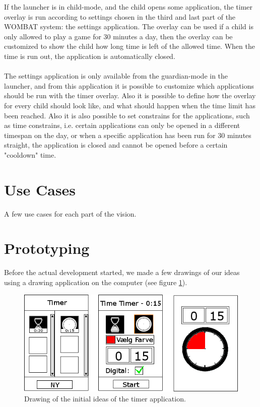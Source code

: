 	If the launcher is in child-mode, and the child opens some application, the timer overlay is run according to settings chosen in the third and last part of the WOMBAT system: the settings application. The overlay can be used if a child is only allowed to play a game for 30 minutes a day, then the overlay can be customized to show the child how long time is left of the allowed time. When the time is run out, the application is automatically closed.\\ \\
	The settings application is only available from the guardian-mode in the launcher, and from this application it is possible to customize which applications should be run with the timer overlay. Also it is possible to define how the overlay for every child should look like, and what should happen when the time limit has been reached. Also it is also possible to set constrains for the applications, such as time constrains, i.e. certain applications can only be opened in a different timespan on the day, or when a specific application has been run for 30 minutes straight, the application is closed and cannot be opened before a certain "cooldown" time.

\section{Use Cases}
A few use cases for each part of the vision.

\section{Prototyping}
Before the actual development started, we made a few drawings of our ideas using a drawing application on the computer (see figure \ref{fig:init_drawings}).

\begin{figure}[H]
	\centering
		\includegraphics[width=\textwidth]{Images/paper_prototype/init_drawings.png}
			\caption{Drawing of the initial ideas of the timer application.}
	\label{fig:init_drawings}
\end{figure}

